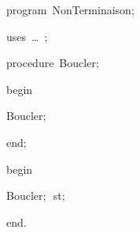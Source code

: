 
{
\parindent {}
\medskip

\carrenoir
\vspace{\neglskip}\mbox{\blc  \idt  \mcl program\idt \label{prog:NonTerminaison}\ NonTerminaison$;$
}\par 
\vspace{\neglskip}\mbox{\blc \blk\idt \mcl uses\idt \ \ldots\ $;$
}\par 
\medskip

\pagebreak[3] 
\vspace{\neglskip}\mbox{\blc  \blk\idt  \mcl procedure\idt \ Boucler$;$}\par 
\vspace{\neglskip}\mbox{\blc  \blk\idt  \mcl begin\idt }\par 
\vspace{\neglskip}\mbox{\blc  \blk\blk\idt  Boucler$;$}\par 
\vspace{\neglskip}\mbox{\blc  \blk\idt  \mcl end\idt $;$}\par 
\medskip

\vspace{\neglskip}\mbox{\blc  \idt  \mcl begin\idt }\par 
\vspace{\neglskip}\mbox{\blc  \blk\idt  Boucler$;$\ st$;$}\par 
\vspace{\neglskip}\mbox{\blc  \idt  \mcl end\idt $.$}\par 

\medskip }

